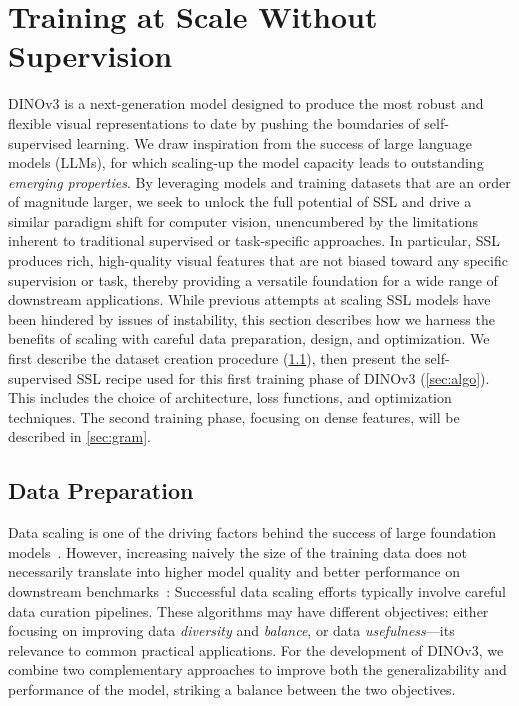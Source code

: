\section{Training at Scale Without Supervision}

DINOv3 is a next-generation model designed to produce the most robust and flexible visual representations to date by pushing the boundaries of self-supervised learning. 
We draw inspiration from the success of large language models (LLMs), for which scaling-up the model capacity leads to outstanding \emph{emerging properties}.
By leveraging models and training datasets that are an order of magnitude larger, we seek to unlock the full potential of SSL and drive a similar paradigm shift for computer vision, unencumbered by the limitations inherent to traditional supervised or task-specific approaches. 
In particular, SSL produces rich, high-quality visual features that are not biased toward any specific supervision or task, thereby providing a versatile foundation for a wide range of downstream applications. 
While previous attempts at scaling SSL models have been hindered by issues of instability, this section describes how we harness the benefits of scaling with careful data preparation, design, and optimization. 
We first describe the dataset creation procedure (\cref{sec:data}), then present the self-supervised SSL recipe used for this first training phase of DINOv3 (\cref{sec:algo}).
This includes the choice of architecture, loss functions, and optimization techniques. 
The second training phase, focusing on dense features, will be described in \cref{sec:gram}.







\subsection{Data Preparation}
\label{sec:data}
Data scaling is one of the driving factors behind the success of large foundation models~\citep{touvron2023llama,radford2021learning,xu2024demystifying,oquab2024dinov2}.
However, increasing naively the size of the training data does not necessarily translate into higher model quality and better performance on downstream benchmarks~\citep{goyal2021self,oquab2024dinov2,vo2024automatic}: 
Successful data scaling efforts typically involve careful data curation pipelines.
These algorithms may have different objectives: either focusing on improving data \textit{diversity} and \textit{balance}, or data \textit{usefulness}---its relevance to common practical applications.
For the development of DINOv3, we combine two complementary approaches to improve both the generalizability and performance of the model, striking a balance between the two objectives. 


